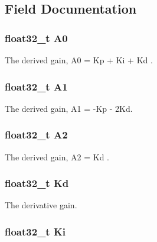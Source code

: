\subsection{Field Documentation}
\hypertarget{structarm__pid__instance__f32_afc2ed2bf70b7d9d84f49ee9ae7caa004}{
\subsubsection[{A0}]{\setlength{\rightskip}{0pt plus 5cm}float32\-\_\-t A0}}\label{structarm__pid__instance__f32_afc2ed2bf70b7d9d84f49ee9ae7caa004}
The derived gain, A0 = Kp + Ki + Kd . \hypertarget{structarm__pid__instance__f32_a5e6785a3a5cf7b98f3bfc7b180d98273}{
\subsubsection[{A1}]{\setlength{\rightskip}{0pt plus 5cm}float32\-\_\-t A1}}\label{structarm__pid__instance__f32_a5e6785a3a5cf7b98f3bfc7b180d98273}
The derived gain, A1 = -\/\-Kp -\/ 2\-Kd. \hypertarget{structarm__pid__instance__f32_a5b00947275caf079f351271bf41573fe}{
\subsubsection[{A2}]{\setlength{\rightskip}{0pt plus 5cm}float32\-\_\-t A2}}\label{structarm__pid__instance__f32_a5b00947275caf079f351271bf41573fe}
The derived gain, A2 = Kd . \hypertarget{structarm__pid__instance__f32_ace6b9e405a991cbaf6b4c137ca0d51a3}{
\subsubsection[{Kd}]{\setlength{\rightskip}{0pt plus 5cm}float32\-\_\-t Kd}}\label{structarm__pid__instance__f32_ace6b9e405a991cbaf6b4c137ca0d51a3}
The derivative gain. \hypertarget{structarm__pid__instance__f32_ad1a1aa1c10a2dca201a3422f82198777}{
\subsubsection[{Ki}]{\setlength{\rightskip}{0pt plus 5cm}float32\-\_\-t Ki}}\label{structarm__pid__instance__f32_ad1a1aa1c10a2dca201a3422f82198777}
